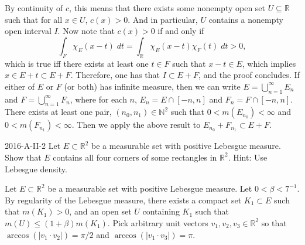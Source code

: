 \documentclass{article}
\begin{document}
			By continuity of $c$, this means that there exists some nonempty open set $U \subseteq \mathbb{R}$ such that for all $x \in U$, $c(x) > 0$. And in particular, $U$ contains a nonempty open interval $I$. Now note that $c(x) > 0$ if and only if 
			\begin{equation*}
				\int_{F}\chi_{E}(x - t)\;dt = \int_{\mathbb{R}}\chi_{E}(x - t)\chi_{F}(t)\;dt > 0, 
			\end{equation*}
			which is true iff there exists at least one $t \in F$ such that $x - t \in E$, which implies $x \in E + t \subset E + F$. Therefore, one has that $I \subset E + F$, and the proof concludes. If either of $E$ or $F$ (or both) has infinite measure, then we can write $E = \bigcup_{n = 1}^{\infty}E_{n}$ and $F = \bigcup_{n = 1}^{\infty}F_{n}$, where for each $n$, $E_{n} = E \cap [-n,n]$ and $F_{n} = F \cap [-n,n]$. There exists at least one pair, $(n_{0}, n_{1}) \in \mathbb{N}^2$ such that $0 < m(E_{n_{0}}) < \infty$ and $0 < m(F_{n_{1}}) < \infty$. Then we apply the above result to $E_{n_{0}} + F_{n_{1}} \subset E + F$.  
		
		\begin{prb}{2016-A-II-2}
			Let $E \subset \mathbb{R}^2$ be a measurable set with positive Lebesgue measure. Show that $E$ contains all four corners of some rectangles in $\mathbb{R}^2$. Hint: Use Lebesgue density. 
		\end{prb}
		
		Let $E \subset \mathbb{R}^2$ be a measurable set with positive Lebesgue measure. Let $0 < \beta < 7^{-1}$. By regularity of the Lebesgue measure, there exists a compact set $K_1 \subset E$ such that $m(K_1) > 0$, and an open set $U$ containing $K_1$ such that $m(U) \leq (1 + \beta)m(K_1)$. Pick arbitrary unit vectors $v_1, v_2, v_3 \in \mathbb{R}^2$ so that $\arccos(|v_1 \cdot v_2|) = \pi/2$ and $\arccos(|v_1 \cdot v_3|) = \pi$.  
		
\end{document}
